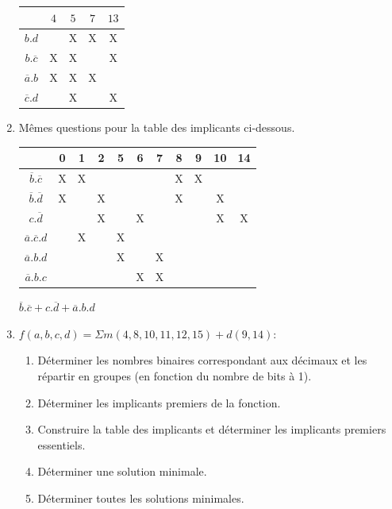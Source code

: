 \documentclass[a4paper,10pt]{exam}
\begin{document}
\begin{enumerate}
      \begin{center}
      \begin{tabular}{c|c|c|c|c|}
        & $4$& $5$ & $7$ & $13$\\
                       \hline
        $b.d$           &   & X & X & X \\
        $b.\overline{c}$& X & X &   & X \\
        $\overline{a}.b$& X & X & X &   \\
        $\overline{c}.d$&   & X &   & X
      \end{tabular}
      \end{center}
    \item Mêmes questions pour la table des implicants ci-dessous.
      \begin{center}
      \begin{tabular}{c|c|c|c|c|c|c|c|c|c|c|}
                                   &0&1&2&5&6&7&8&9&10&14\\
                                   \hline
        $\overline{b}.\overline{c}$ &X&X& & & & &X&X&  &  \\
        $\overline{b}.\overline{d}$ &X& &X& & & &X& &X &  \\
        $c.\overline{d}$            & & &X& &X& & & &X &X \\
        $\overline{a}.\overline{c}.d$& &X& &X& & & & &  &  \\
        $\overline{a}.b.d$           & & & &X& &X& & &  &  \\
        $\overline{a}.b.c$           & & & & &X&X& & &  &
      \end{tabular}
      \end{center}

      \begin{solution}
        $\overline{b}.\overline{c} + c.\overline{d} + \overline{a}.b.d$
      \end{solution}

    \item $f(a,b,c,d)=\Sigma m(4,8,10,11,12,15) + d(9,14)$:
      \begin{enumerate}
        \item Déterminer les nombres binaires correspondant aux décimaux et les
          répartir en groupes (en fonction du nombre de bits à 1).
        \item Déterminer les implicants premiers de la fonction.
        \item Construire la table des implicants et déterminer les implicants
          premiers essentiels.
        \item Déterminer une solution minimale.
        \item Déterminer toutes les solutions minimales.
      \end{enumerate}


\end{enumerate}
\end{document}

